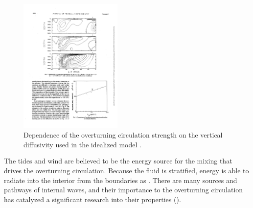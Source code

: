 \begin{figure}[hbt]
  \begin{center}
  \includegraphics[width=2in]{figs/WaterMasses/Bryan87Fig8}
      \caption{Dependence of the overturning circulation strength on the vertical diffusivity used in the idealized model \citep{bryan87}.}
    \label{fig:Bryan87Fig8}  
  \end{center}
\end{figure}

The tides and wind are believed to be the energy source for the mixing that drives the overturning circulation.  Because the fluid is stratified, energy is able to radiate into the interior from the boundaries as .  There are many sources and pathways of internal waves, and their importance to the overturning circulation has catalyzed a significant research into their properties ().

